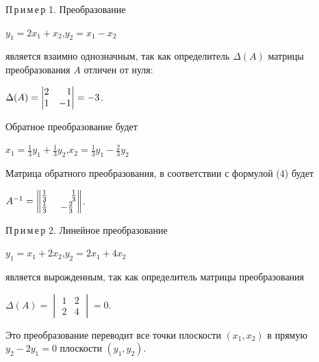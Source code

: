 \documentclass[a4paper, 14pt]{article}
\begin{document}
\begin{small}
П\,р\,и\,м\,е\,р 1. Преобразование
\begin{center}
\normalsize{$y_1=2x_1 + x_2$,\hspace{5mm}$y_2=x_1 - x_2$}
\end{center}
является взаимно однозначным, так как определитель $\Delta(A)$ матрицы преобразования $A$ отличен от нуля:

\begin{center}
\normalsize{$\Delta(A) = \begin{vmatrix}
2 & \hspace{3mm}1\\
1 & -1
\end{vmatrix} = -3$.}
\end{center}
Обратное преобразование будет
\begin{center}
    \normalsize{$x_1 = \frac{1}{3}y_1 + \frac{1}{3}y_2$,\hspace{5mm}$x_2 = \frac{1}{3}y_1 - \frac{2}{3}y_2$}
\end{center}
Матрица обратного преобразования, в соответствии с формулой (4) будет
\begin{center}
\Large{
$A^{-1} = \begin{Vmatrix}
\frac{1}{3} & \hspace{5mm}\frac{1}{3}\\
\frac{1}{3} & -\frac{2}{3}
\end{Vmatrix}$.}
\end{center}

П\,р\,и\,м\,е\,р 2. Линейное преобразование
\begin{center}
\normalsize{$y_1=x_1 + 2x_2$,\hspace{5mm}$y_2=2x_1 + 4x_2$}
\end{center}
является вырожденным, так как определитель матрицы преобразования
\begin{center}
\normalsize{$\Delta(A) = \begin{vmatrix}
1 & 2\\
2 & 4
\end{vmatrix} = 0$.}
\end{center}
Это преобразование переводит все точки плоскости $(x_1, x_2)$ в прямую $y_2 - 2y_1 = 0$ плоскости $(y_1, y_2).$
\end{small}
\newpage
\thispagestyle{second}
\begin{center}
\textbf{\large{}}%
\end{center}
\end{document}
